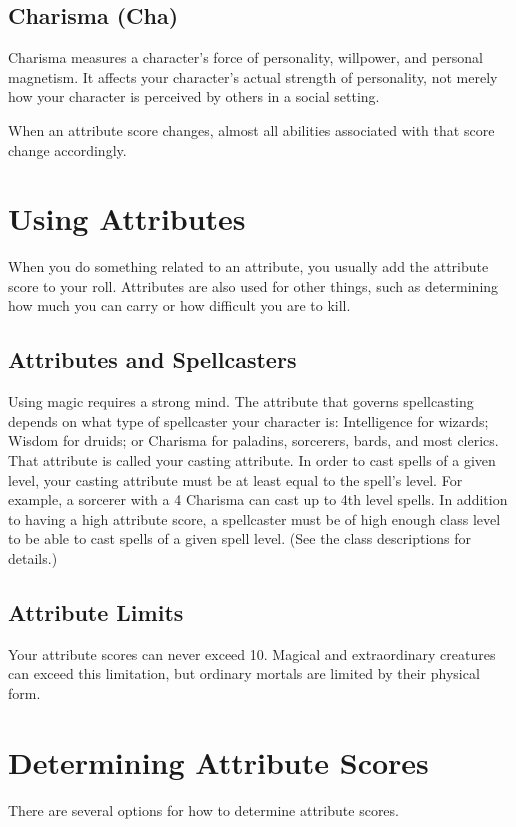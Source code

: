 \subsection{Charisma (Cha)}
Charisma measures a character's force of personality, willpower, and personal magnetism. It affects your character's actual strength of personality, not merely how your character is perceived by others in a social setting.

When an attribute score changes, almost all abilities associated with that score change accordingly.

\section{Using Attributes}
When you do something related to an attribute, you usually add the attribute score to your roll. Attributes are also used for other things, such as determining how much you can carry or how difficult you are to kill. 

\subsection{Attributes and Spellcasters}
Using magic requires a strong mind. The attribute that governs spellcasting depends on what type of spellcaster your character is: Intelligence for wizards; Wisdom for druids; or Charisma for paladins, sorcerers, bards, and most clerics. That attribute is called your casting attribute. In order to cast spells of a given level, your casting attribute must be at least equal to the spell's level. For example, a sorcerer with a 4 Charisma can cast up to 4th level spells. In addition to having a high attribute score, a spellcaster must be of high enough class level to be able to cast spells of a given spell level. (See the class descriptions for details.)

\subsection{Attribute Limits}
Your attribute scores can never exceed 10. Magical and extraordinary creatures can exceed this limitation, but ordinary mortals are limited by their physical form.

\section{Determining Attribute Scores}
There are several options for how to determine attribute scores.

